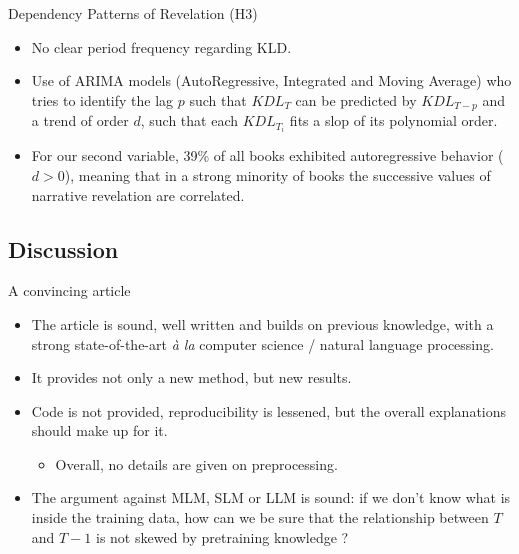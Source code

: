 \documentclass[aspectratio=169]{beamer}
\begin{document}
\begin{frame}{Dependency Patterns of Revelation (H3)}
    \begin{itemize}
        \item No clear period frequency regarding KLD.
        \item Use of ARIMA models (AutoRegressive, Integrated and Moving Average) who tries to identify the lag $p$ such that $KDL_{T}$ can be predicted by $KDL_{T-p}$ and a trend of order $d$, such that each $KDL_{T_{i}}$ fits a slop of its polynomial order.
        \item For our second variable, 39\% of all books exhibited autoregressive behavior ($d > 0$), meaning that in a strong minority of books the successive values of narrative revelation are correlated.
    \end{itemize}
\end{frame}


\subsection{Discussion}

\begin{frame}{A convincing article}
    \begin{itemize}
        \item The article is sound, well written and builds on previous knowledge, with a strong state-of-the-art \textit{à la} computer science / natural language processing.
        \item It provides not only a new method, but new results. 
        \item Code is not provided, reproducibility is lessened, but the overall explanations should make up for it.
        \begin{itemize}
            \item Overall, no details are given on preprocessing.
        \end{itemize}
        \item The argument against MLM, SLM or LLM is sound: if we don't know what is inside the training data, how can we be sure that the relationship between $T$ and $T-1$ is not skewed by pretraining knowledge ?
    \end{itemize}
\end{frame}
\end{document}
